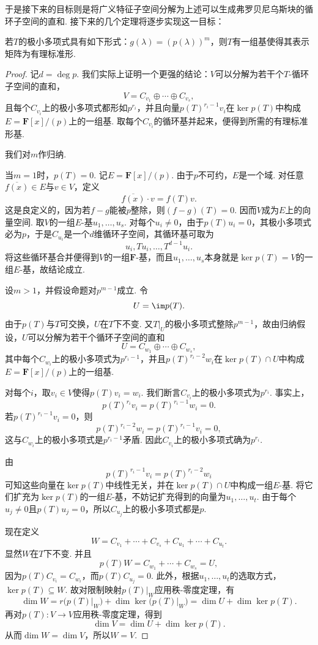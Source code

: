 于是接下来的目标则是将广义特征子空间分解为上述可以生成弗罗贝尼乌斯块的循环子空间的直和. 接下来的几个定理将逐步实现这一目标：
\begin{theorem}{}{}
    若$T$的极小多项式具有如下形式：$g(\lambda)=(p(\lambda))^m$，则$T$有一组基使得其表示矩阵为有理标准形.
\end{theorem}
\begin{proof}
    记$d=\deg p$. 我们实际上证明一个更强的结论：$V$可以分解为若干个$T$-循环子空间的直和，
    \[
        V=C_{v_1}\oplus\cdots\oplus C_{v_s},
    \]
    且每个$C_{v_i}$上的极小多项式都形如$p^{r_i}$，并且向量$p(T)^{r_i-1}v_i$在$\ker p(T)$中构成$E=\mathbf{F}[x]/(p)$上的一组基. 取每个$C_{v_i}$的循环基并起来，便得到所需的有理标准形基.

    我们对$m$作归纳.

    当$m=1$时，$p(T)=0$. 记$E=\mathbf{F}[x]/(p)$. 由于$p$不可约，$E$是一个域. 对任意$\overline{f(x)}\in E$与$v\in V$，定义
    \[
        \overline{f(x)}\cdot v=f(T)v.
    \]
    这是良定义的，因为若$f-g$能被$p$整除，则$(f-g)(T)=0$. 因而$V$成为$E$上的向量空间. 取$V$的一组$E$-基$u_1,\ldots,u_s$. 对每个$u_i\neq 0$，由于$p(T)u_i=0$，其极小多项式必为$p$，于是$C_{u_i}$是一个$d$维循环子空间，其循环基可取为
    \[
        u_i,Tu_i,\ldots,T^{d-1}u_i.
    \]
    将这些循环基合并便得到$V$的一组$\mathbf{F}$-基，而且$u_1,\ldots,u_s$本身就是$\ker p(T)=V$的一组$E$-基，故结论成立.

    设$m>1$，并假设命题对$p^{m-1}$成立. 令
    \[
        U=\im p(T).
    \]
    由于$p(T)$与$T$可交换，$U$在$T$下不变. 又$T\vert_U$的极小多项式整除$p^{m-1}$，故由归纳假设，$U$可以分解为若干个循环子空间的直和
    \[
        U=C_{w_1}\oplus\cdots\oplus C_{w_s},
    \]
    其中每个$C_{w_i}$上的极小多项式为$p^{r_i-1}$，并且$p(T)^{r_i-2}w_i$在$\ker p(T)\cap U$中构成$E=\mathbf{F}[x]/(p)$上的一组基.

    对每个$i$，取$v_i\in V$使得$p(T)v_i=w_i$. 我们断言$C_{v_i}$上的极小多项式为$p^{r_i}$. 事实上，
    \[
        p(T)^{r_i}v_i=p(T)^{r_i-1}w_i=0.
    \]
    若$p(T)^{r_i-1}v_i=0$，则
    \[
        p(T)^{r_i-2}w_i=p(T)^{r_i-1}v_i=0,
    \]
    这与$C_{w_i}$上的极小多项式是$p^{r_i-1}$矛盾. 因此$C_{v_i}$上的极小多项式确为$p^{r_i}$.

    由
    \[
        p(T)^{r_i-1}v_i=p(T)^{r_i-2}w_i
    \]
    可知这些向量在$\ker p(T)$中线性无关，并在$\ker p(T)\cap U$中构成一组$E$-基. 将它们扩充为$\ker p(T)$的一组$E$-基，不妨记扩充得到的向量为$u_1,\ldots,u_t$. 由于每个$u_j\neq 0$且$p(T)u_j=0$，所以$C_{u_j}$上的极小多项式都是$p$.

    现在定义
    \[
        W=C_{v_1}+\cdots+C_{v_s}+C_{u_1}+\cdots+C_{u_t}.
    \]
    显然$W$在$T$下不变. 并且
    \[
        p(T)W=C_{w_1}+\cdots+C_{w_s}=U,
    \]
    因为$p(T)C_{v_i}=C_{w_i}$，而$p(T)C_{u_j}=0$. 此外，根据$u_1,\ldots,u_t$的选取方式，$\ker p(T)\subseteq W$. 故对限制映射$p(T)\vert_W$应用秩-零度定理，有
    \[
        \dim W=r\bigl(p(T)\vert_W\bigr)+\dim\ker\bigl(p(T)\vert_W\bigr)=\dim U+\dim\ker p(T).
    \]
    再对$p(T):V\to V$应用秩-零度定理，得到
    \[
        \dim V=\dim U+\dim\ker p(T).
    \]
    从而$\dim W=\dim V$，所以$W=V$.


\end{proof}
